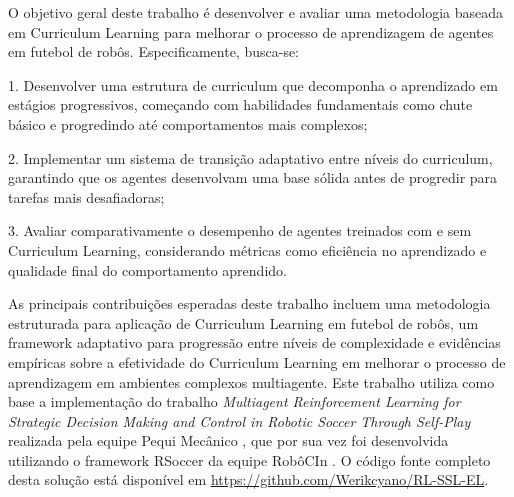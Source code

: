 O objetivo geral deste trabalho é desenvolver e avaliar uma metodologia baseada em Curriculum Learning para melhorar o processo de aprendizagem de agentes em futebol de robôs. Especificamente, busca-se:

1. Desenvolver uma estrutura de curriculum que decomponha o aprendizado em estágios progressivos, começando com habilidades fundamentais como chute básico e progredindo até comportamentos mais complexos;

2. Implementar um sistema de transição adaptativo entre níveis do curriculum, garantindo que os agentes desenvolvam uma base sólida antes de progredir para tarefas mais desafiadoras;

3. Avaliar comparativamente o desempenho de agentes treinados com e sem Curriculum Learning, considerando métricas como eficiência no aprendizado e qualidade final do comportamento aprendido.

As principais contribuições esperadas deste trabalho incluem uma metodologia estruturada para aplicação de Curriculum Learning em futebol de robôs, um framework adaptativo para progressão entre níveis de complexidade e evidências empíricas sobre a efetividade do Curriculum Learning em melhorar o processo de aprendizagem em ambientes complexos multiagente. Este trabalho utiliza como base a implementação do trabalho \textit{Multiagent Reinforcement Learning for Strategic Decision Making and Control in Robotic Soccer Through Self-Play} \cite{bruno_brandao} realizada pela equipe Pequi Mecânico \cite{pequi_mecanico}, que por sua vez foi desenvolvida utilizando o framework RSoccer \cite{rSoccer} da equipe RobôCIn \cite{robocin}. O código fonte completo desta solução está disponível em \url{https://github.com/Werikcyano/RL-SSL-EL}.
